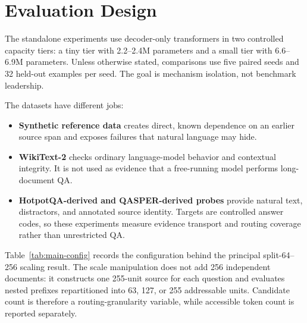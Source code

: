 \documentclass[11pt]{article}
\begin{document}
\section{Evaluation Design}
\label{sec:eval}

The standalone experiments use decoder-only transformers in two controlled capacity
tiers: a tiny tier with 2.2--2.4M parameters and a small tier with 6.6--6.9M parameters.
Unless otherwise stated, comparisons use five paired seeds and 32 held-out examples per
seed. The goal is mechanism isolation, not benchmark leadership.

The datasets have different jobs:
\begin{itemize}[leftmargin=*]
\item \textbf{Synthetic reference data} creates direct, known dependence on an earlier
source span and exposes failures that natural language may hide.
\item
  \textbf{WikiText-2} checks ordinary language-model behavior and contextual integrity.
It is not used as evidence that a free-running model performs long-document QA.
\item
  \textbf{HotpotQA-derived and QASPER-derived probes} provide natural text, distractors,
and annotated source identity. Targets are controlled answer codes,
so these experiments measure evidence transport and routing coverage rather than
unrestricted QA.
\end{itemize}

Table~\ref{tab:main-config} records the configuration behind the principal split-64--256
scaling result. The scale manipulation does not add 256 independent documents:
it constructs one 255-unit source for each question and evaluates nested prefixes
repartitioned into 63, 127, or 255 addressable units.
Candidate count is therefore a routing-granularity variable,
while accessible token count is reported separately.
\end{document}
